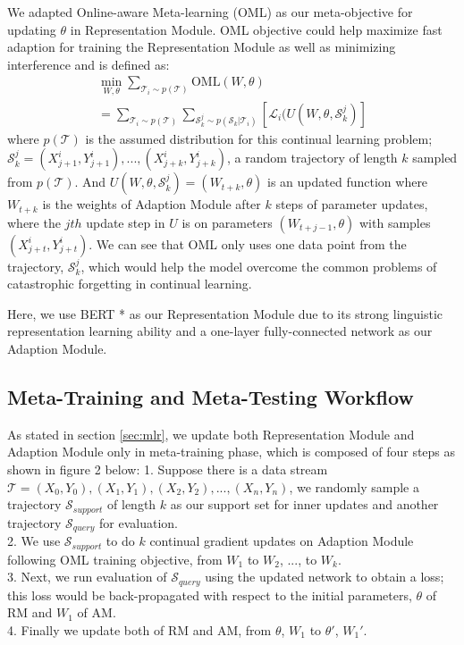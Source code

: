We adapted Online-aware Meta-learning (OML) as our meta-objective for updating $\theta$ in Representation Module. OML objective could help maximize fast adaption for training the Representation Module as well as minimizing interference and is defined as:
\begin{equation}
    \begin{aligned}
       \min_{W, \theta} \sum_{\mathcal{T}_i \sim p(\mathcal{T})} \mathrm{OML}(W, \theta) \\
       = \sum_{\mathcal{T}_i \sim p(\mathcal{T})} \sum_{\mathcal{S}_k ^ j \sim p(\mathcal{S}_k | \mathcal{T}_i)} [\mathcal{L}_i (U(W, \theta, \mathcal{S}_k ^ j)]
   \end{aligned}
\end{equation}
where $p(\mathcal{T})$ is the assumed distribution for this continual learning problem; $\mathcal{S}_k ^ j = (X_{j+1}^i, Y_{j+1}^i), ..., (X_{j+k}^i, Y_{j+k}^i)$, a random trajectory of length $k$ sampled from $p(\mathcal{T})$. And $U(W, \theta, \mathcal{S}_k ^ j) = (W_{t+k}, \theta)$ is an updated function where $W_{t+k}$ is the weights of Adaption Module after $k$ steps of parameter updates, where the $jth$ update step in $U$ is on parameters $(W_{t+j-1}, \theta)$ with samples $(X_{j+t}^i, Y_{j+t}^i)$. We can see that OML only uses one data point from the trajectory, $\mathcal{S}_k ^ j$, which would help the model overcome the common problems of catastrophic forgetting in continual learning. 

Here, we use BERT * as our Representation Module due to its strong linguistic representation learning ability and a one-layer fully-connected network as our Adaption Module. 

\subsection{Meta-Training and Meta-Testing Workflow}
As stated in section \ref{sec:mlr}, we update both Representation Module and Adaption Module only in meta-training phase, which is composed of four steps as shown in figure 2 below: 
1. Suppose there is a data stream $\mathcal{T} = (X_0, Y_0), (X_1, Y_1), (X_2, Y_2), ..., (X_n, Y_n)$, we randomly sample a trajectory $\mathcal{S}_{support}$ of length $k$ as our support set for inner updates and another trajectory $\mathcal{S}_{query}$ for evaluation. \\
2. We use $\mathcal{S}_{support}$ to do $k$ continual gradient updates on Adaption Module following OML training objective, from  $W_1$ to $W_2$, ..., to $W_k$. \\
3. Next, we run evaluation of $\mathcal{S}_{query}$ using the updated network to obtain a loss; this loss would be back-propagated with respect to the initial parameters, $\theta$ of RM and $W_1$ of AM. \\
4. Finally we update both of RM and AM, from  $\theta$, $W_1$ to $\theta'$, $W_1'$.

